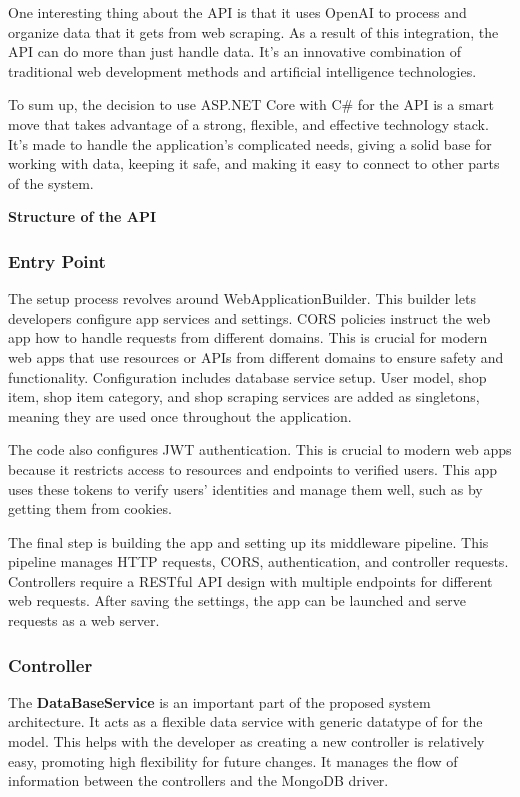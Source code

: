 One interesting thing about the API is that it uses OpenAI to process and organize data that it gets from web scraping. As a result of this integration, the API can do more than just handle data. It's an innovative combination of traditional web development methods and artificial intelligence technologies.

\newpage

To sum up, the decision to use ASP.NET Core with C\# for the API is a smart move that takes advantage of a strong, flexible, and effective technology stack. It's made to handle the application's complicated needs, giving a solid base for working with data, keeping it safe, and making it easy to connect to other parts of the system.

\noindent\textbf{Structure of the API}

\subsubsection{Entry Point}

The setup process revolves around WebApplicationBuilder. This builder lets developers configure app services and settings. CORS policies instruct the web app how to handle requests from different domains. This is crucial for modern web apps that use resources or APIs from different domains to ensure safety and functionality. Configuration includes database service setup. User model, shop item, shop item category, and shop scraping services are added as singletons, meaning they are used once throughout the application.

The code also configures JWT authentication. This is crucial to modern web apps because it restricts access to resources and endpoints to verified users. This app uses these tokens to verify users' identities and manage them well, such as by getting them from cookies.

The final step is building the app and setting up its middleware pipeline. This pipeline manages HTTP requests, CORS, authentication, and controller requests. Controllers require a RESTful API design with multiple endpoints for different web requests. After saving the settings, the app can be launched and serve requests as a web server.

\subsubsection{Controller}

The \textbf{DataBaseService} is an important part of the proposed system architecture. It acts as a flexible data service with generic datatype of for the model. This helps with the developer as creating a new controller is relatively easy, promoting high flexibility for future changes. It manages the flow of information between the controllers and the MongoDB driver.  

